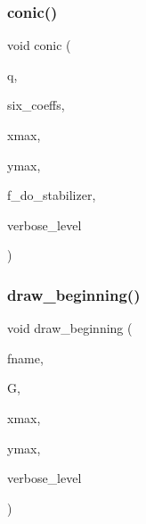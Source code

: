 \mbox{\label{conic_8_c_a96def9474b981a9d5831a9b48d85d652}} 
\subsubsection{\texorpdfstring{conic()}{conic()}}
{\footnotesize\ttfamily void conic (\begin{DoxyParamCaption}\item[{\mbox{\hyperlink{galois_8h_a09fddde158a3a20bd2dcadb609de11dc}{I\+NT}}}]{q,  }\item[{\mbox{\hyperlink{galois_8h_a09fddde158a3a20bd2dcadb609de11dc}{I\+NT}} $\ast$}]{six\+\_\+coeffs,  }\item[{\mbox{\hyperlink{galois_8h_a09fddde158a3a20bd2dcadb609de11dc}{I\+NT}}}]{xmax,  }\item[{\mbox{\hyperlink{galois_8h_a09fddde158a3a20bd2dcadb609de11dc}{I\+NT}}}]{ymax,  }\item[{\mbox{\hyperlink{galois_8h_a09fddde158a3a20bd2dcadb609de11dc}{I\+NT}}}]{f\+\_\+do\+\_\+stabilizer,  }\item[{\mbox{\hyperlink{galois_8h_a09fddde158a3a20bd2dcadb609de11dc}{I\+NT}}}]{verbose\+\_\+level }\end{DoxyParamCaption})}

\mbox{\label{conic_8_c_acc89357b4d9e622a5351e636fb9909ae}} 
\subsubsection{\texorpdfstring{draw\+\_\+beginning()}{draw\_beginning()}}
{\footnotesize\ttfamily void draw\+\_\+beginning (\begin{DoxyParamCaption}\item[{char $\ast$}]{fname,  }\item[{\mbox{\hyperlink{classmp__graphics}{mp\+\_\+graphics}} $\ast$\&}]{G,  }\item[{\mbox{\hyperlink{galois_8h_a09fddde158a3a20bd2dcadb609de11dc}{I\+NT}}}]{xmax,  }\item[{\mbox{\hyperlink{galois_8h_a09fddde158a3a20bd2dcadb609de11dc}{I\+NT}}}]{ymax,  }\item[{\mbox{\hyperlink{galois_8h_a09fddde158a3a20bd2dcadb609de11dc}{I\+NT}}}]{verbose\+\_\+level }\end{DoxyParamCaption})}


